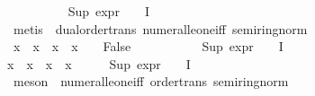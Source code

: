 \begin{isabellebody}
\ \ \ \ \ \ \ \ \isamarkupfalse%
\ {\isacartoucheopen}Sup\ {\isacharparenleft}{\kern0pt}{\isacharparenleft}{\kern0pt}expr{\isacharunderscore}{\kern0pt}{}\ {\isasymcirc}\ {\isasymPhi}{\isacharparenright}{\kern0pt}\ {\isacharbackquote}{\kern0pt}\ I{\isacharparenright}{\kern0pt}\ {\isasymle}\ {}{\isacartoucheclose}\isanewline
\ \ \ \ \ \ \ \ \isamarkupfalse%
\ {\isacharparenleft}{\kern0pt}metis\ \ dual{\isacharunderscore}{\kern0pt}order{\isachardot}{\kern0pt}trans\ numeral{\isacharunderscore}{\kern0pt}le{\isacharunderscore}{\kern0pt}one{\isacharunderscore}{\kern0pt}iff\ semiring{\isacharunderscore}{\kern0pt}norm{\isacharparenleft}{\kern0pt}{}{}{\isacharparenright}{\kern0pt}{\isacharparenright}{\kern0pt}\isanewline
\ \ \ \ \ \ \isamarkupfalse%
\ {\isachardoublequoteopen}{\isacharparenleft}{\kern0pt}x{}{}\ {\isacharbackquote}{\kern0pt}\ x{}{}\ {\isasymunion}\ x{}{}\ {\isacharbackquote}{\kern0pt}\ x{}{}{\isacharparenright}{\kern0pt}\ {\isasymnoteq}\ {\isacharbraceleft}{\kern0pt}{\isacharbraceright}{\kern0pt}\ {\isasymlongrightarrow}\ False{\isachardoublequoteclose}\ \isanewline
\ \ \ \ \ \ \ \ \isamarkupfalse%
\ {\isacartoucheopen}Sup\ {\isacharparenleft}{\kern0pt}{\isacharparenleft}{\kern0pt}expr{\isacharunderscore}{\kern0pt}{}\ {\isasymcirc}\ {\isasymPhi}{\isacharparenright}{\kern0pt}\ {\isacharbackquote}{\kern0pt}\ I{\isacharparenright}{\kern0pt}\ {\isasymle}\ {}{\isacartoucheclose}\ \isanewline
{\isacartoucheopen}x{}{}\ {\isacharbackquote}{\kern0pt}\ x{}{}\ {\isasymunion}\ x{}{}\ {\isacharbackquote}{\kern0pt}\ x{}{}\ {\isasymnoteq}\ {\isacharbraceleft}{\kern0pt}{\isacharbraceright}{\kern0pt}\ {\isasymlongrightarrow}\ {}\ {\isasymle}\ Sup\ {\isacharparenleft}{\kern0pt}{\isacharparenleft}{\kern0pt}expr{\isacharunderscore}{\kern0pt}{}\ {\isasymcirc}\ {\isasymPhi}{\isacharparenright}{\kern0pt}\ {\isacharbackquote}{\kern0pt}\ I{\isacharparenright}{\kern0pt}{\isacartoucheclose}\isanewline
\ \ \ \ \ \ \ \ \isamarkupfalse%
\ {\isacharparenleft}{\kern0pt}meson\ \ numeral{\isacharunderscore}{\kern0pt}le{\isacharunderscore}{\kern0pt}one{\isacharunderscore}{\kern0pt}iff\ order{\isacharunderscore}{\kern0pt}trans\ semiring{\isacharunderscore}{\kern0pt}norm{\isacharparenleft}{\kern0pt}{}{}{\isacharparenright}{\kern0pt}{\isacharparenright}{\kern0pt}\isanewline

\end{isabellebody}
